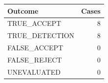 \begin{tabular}{lr}\toprule
Outcome & Cases\\\midrule
TRUE\_ACCEPT & 8\\
TRUE\_DETECTION & 8\\
FALSE\_ACCEPT & 0\\
FALSE\_REJECT & 0\\
UNEVALUATED & 0\\\bottomrule
\end{tabular}
